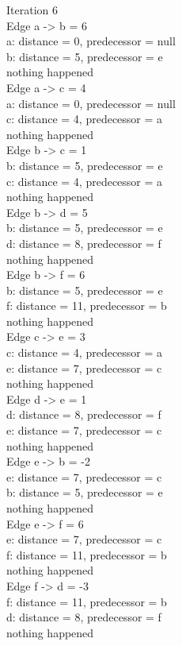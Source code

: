\noindent Iteration 6\\
Edge a -> b = 6\\
a: distance = 0, predecessor = null\\
b: distance = 5, predecessor = e\\
nothing happened\\
Edge a -> c = 4\\
a: distance = 0, predecessor = null\\
c: distance = 4, predecessor = a\\
nothing happened\\
Edge b -> c = 1\\
b: distance = 5, predecessor = e\\
c: distance = 4, predecessor = a\\
nothing happened\\
Edge b -> d = 5\\
b: distance = 5, predecessor = e\\
d: distance = 8, predecessor = f\\
nothing happened\\
Edge b -> f = 6\\
b: distance = 5, predecessor = e\\
f: distance = 11, predecessor = b\\
nothing happened\\
Edge c -> e = 3\\
c: distance = 4, predecessor = a\\
e: distance = 7, predecessor = c\\
nothing happened\\
Edge d -> e = 1\\
d: distance = 8, predecessor = f\\
e: distance = 7, predecessor = c\\
nothing happened\\
Edge e -> b = -2\\
e: distance = 7, predecessor = c\\
b: distance = 5, predecessor = e\\
nothing happened\\
Edge e -> f = 6\\
e: distance = 7, predecessor = c\\
f: distance = 11, predecessor = b\\
nothing happened\\
Edge f -> d = -3\\
f: distance = 11, predecessor = b\\
d: distance = 8, predecessor = f\\
nothing happened\\

